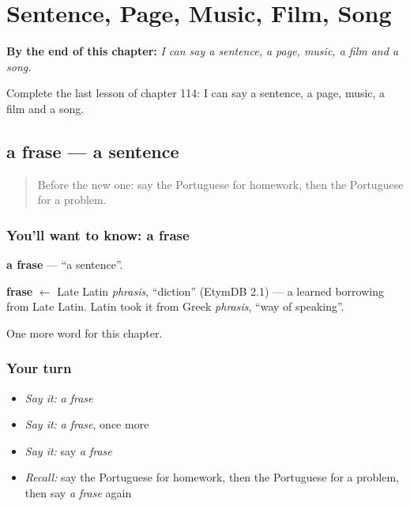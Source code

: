 
\chapter{Sentence, Page, Music, Film, Song}
\label{ch:pt-sentence-page-music-film-song}

\begin{chapteropening}
\textbf{By the end of this chapter:} \emph{I can say a sentence, a page, music, a film and a song.}

Complete the last lesson of chapter 114: I can say a sentence, a page, music, a film and a song.
\end{chapteropening}

\section[a frase]{a frase — a sentence}

\label{lesson:PT-C114-frase}



\begin{quote}
Before the new one: say the Portuguese for homework, then the Portuguese for a problem.
\end{quote}

\subsection*{You'll want to know: a frase}
\textbf{a frase} — \textquotedblleft{}a sentence\textquotedblright{}.

\begin{cousinweb}
\textbf{frase} $\leftarrow$ Late Latin \emph{phrasis}, \textquotedblleft{}diction\textquotedblright{} (EtymDB 2.1) — a learned borrowing from Late Latin. Latin took it from Greek \emph{phrasis}, \textquotedblleft{}way of speaking\textquotedblright{}.
\end{cousinweb}

\begin{grammarlens}[title={What you've built}]
One more word for this chapter.
\end{grammarlens}

\subsection*{Your turn}
\begin{itemize}
\raggedright
  \item \emph{Say it:} \emph{a frase}
  \item \emph{Say it:} \emph{a frase}, once more
  \item \emph{Say it:} say \emph{a frase}
  \item \emph{Recall:} say the Portuguese for homework, then the Portuguese for a problem, then say \emph{a frase} again
\end{itemize}

